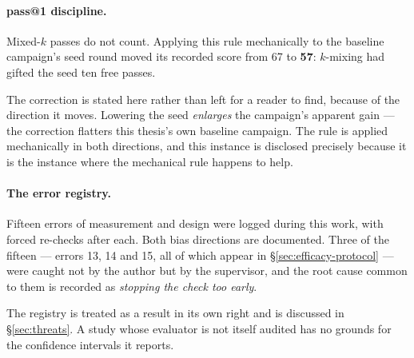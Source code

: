 \paragraph{pass@1 discipline.} Mixed-$k$ passes do not count. Applying this
rule mechanically to the baseline campaign's seed round moved its recorded
score from 67 to \textbf{57}: $k$-mixing had gifted the seed ten free
passes.

The correction is stated here rather than left for a reader to find,
because of the direction it moves. Lowering the seed \emph{enlarges} the
campaign's apparent gain --- the correction flatters this thesis's own
baseline campaign. The rule is applied mechanically in both directions, and
this instance is disclosed precisely because it is the instance where the
mechanical rule happens to help.

\paragraph{The error registry.} Fifteen errors of measurement and design
were logged during this work, with forced re-checks after each. Both bias
directions are documented. Three of the fifteen --- errors 13, 14 and 15,
all of which appear in \S\ref{sec:efficacy-protocol} --- were caught not by
the author but by the supervisor, and the root cause common to them is
recorded as \emph{stopping the check too early}.

The registry is treated as a result in its own right and is discussed in
\S\ref{sec:threats}. A study whose evaluator is not itself audited has no
grounds for the confidence intervals it reports.
